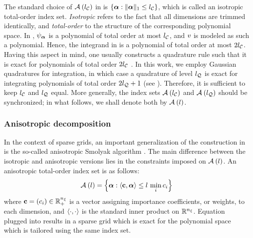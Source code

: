 The standard choice of $\multiindexSet{\nclevel}$ in  is $\{ \multiindex: \norm[1]{\multiindex} \leq \nclevel \}$, which is called an isotropic total-order index set.
\emph{Isotropic} refers to the fact that all dimensions are trimmed identically, and \emph{total-order} to the structure of the corresponding polynomial space.
In , $\polynomial_{\multiindex}$ is a polynomial of total order at most $\nclevel$, and $\w$ is modeled as such a polynomial.
Hence, the integrand in  is a polynomial of total order at most $2 \nclevel$.
Having this aspect in mind, one usually constructs a quadrature rule such that it is exact for polynomials of total order $2 \nclevel$ \cite{eldred2008}.
In this work, we employ Gaussian quadratures for integration, in which case a quadrature of level $\nqlevel$ is exact for integrating polynomials of total order $2 \nqlevel + 1$ (see ).
Therefore, it is sufficient to keep $\nclevel$ and $\nqlevel$ equal.
More generally, the index sets $\multiindexSet{\nclevel}$ and $\multiindexSet{\nqlevel}$ should be synchronized; in what follows, we shall denote both by $\multiindexSet{\level}$.

\subsubsection{Anisotropic decomposition}
In the context of sparse grids, an important generalization of the construction in  is the so-called anisotropic Smolyak algorithm \cite{nobile2008}.
The main difference between the isotropic and anisotropic versions lies in the constraints imposed on $\quadratureMultiindexSet{\level}$.
An anisotropic total-order index set is as follows:
\begin{equation} \elab{anisotropic-total-order-index-set}
  \chaosMultiindexSet{\level} = \left\{ \multiindex: \innerProduct{\dimensionAnisotropy, \multiindex} \leq \level \, \min_i c_i \right\}
\end{equation}
where $\dimensionAnisotropy = (c_i) \in \real^\nvars_+$ is a vector assigning importance coefficients, or weights, to each dimension, and $\innerProduct{\cdot, \cdot}$ is the standard inner product on $\real^\nvars$.
Equation  plugged into  results in a sparse grid which is exact for the polynomial space which is tailored using the same index set.

